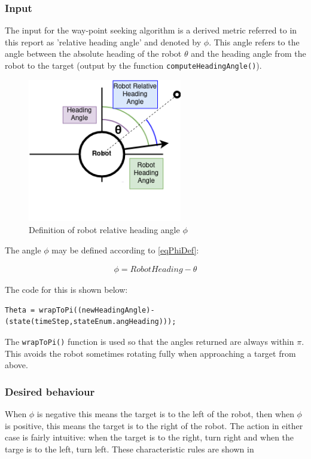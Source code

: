 \documentclass[11pt]{article}
\numberwithin{equation}{section}
\begin{document}
\subsubsection{Input}
\label{sec:org47117be}
The input for the way-point seeking algorithm is a derived metric referred to in this report as 'relative heading angle' and denoted by \(\phi\). This angle refers to the angle between the absolute heading of the robot \(\theta\) and the heading angle from the robot to the target (output by the function \texttt{computeHeadingAngle()}).
\begin{figure}[H]
\centering
\includegraphics[width=0.6\textwidth]{figures/RobotHeadingAngle.png}
\caption{\label{figDefRelHeadingAngle}Definition of robot relative heading angle \(\phi\)}
\end{figure}

The angle \(\phi\) may be defined according to \ref{eqPhiDef}:

\begin{align}
\label{eqPhiDef}
\phi = RobotHeading -\theta
\end{align}

The code for this is shown below:
\begin{verbatim}
Theta = wrapToPi((newHeadingAngle)-(state(timeStep,stateEnum.angHeading)));
\end{verbatim}

The \texttt{wrapToPi()} function is used so that the angles returned are always within \textpm{} \(\pi\). This avoids the robot sometimes rotating fully when approaching a target from above.

\subsubsection{Desired behaviour}
\label{sec:org26b31ff}
When \(\phi\) is negative this means the target is to the left of the robot, then when \(\phi\) is positive, this means the target is to the right of the robot. The action in either case is fairly intuitive: when the target is to the right, turn right and when the targe is to the left, turn left. These characteristic rules are shown in
\end{document}
